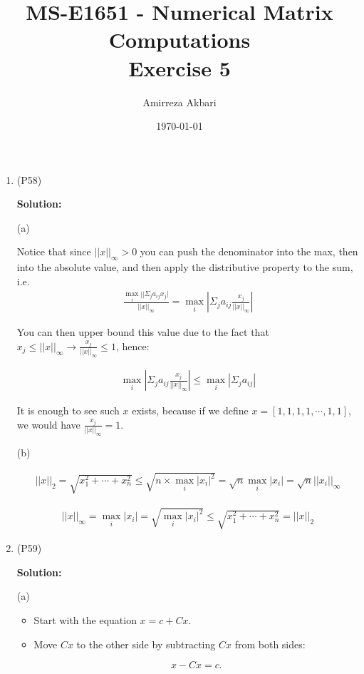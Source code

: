 \documentclass{article}
\title{MS-E1651 - Numerical Matrix Computations
\\Exercise 5}
\author{Amirreza Akbari}
\date{\today}
\begin{document}
\maketitle
\begin{enumerate}[leftmargin=\labelsep]
	\item (P58)
	
	\textbf{Solution:}

	(a) 

	Notice that since $||x||_\infty > 0$ you can push the denominator into the max, then into the absolute value, and then apply the distributive property to the sum, i.e.
	\begin{align}
		\frac{\max_i||\Sigma_j a_{ij}x_j|}{||x||_\infty }= \max_i|\Sigma_j a_{ij}\frac{x_j}{||x||_\infty}|
	\end{align}

	You can then upper bound this value due to the fact that $x_j\leq ||x||_\infty \rightarrow \frac{x_j}{||x||_\infty} \leq 1$, hence:

	\begin{align}
		\max_i|\Sigma_j a_{ij}\frac{x_j}{||x||_\infty}| \leq \max_i |\Sigma_j a_{ij}|
	\end{align}

	It is enough to see such $x$ exists, because if we define $x = [1,1,1,1,\cdots,1,1]$, we would have $\frac{x_j}{||x||_\infty} = 1$.

	(b) 

	\begin{align}
		||x||_2 = \sqrt{x_1^2 + \cdots + x_n^2} \leq \sqrt{n \times \max_i|x_i|^2} = \sqrt{n} \max_i |x_i| =  \sqrt{n} ||x_i||_\infty
	\end{align}

	\begin{align}
		||x||_\infty = \max_i |x_i| = \sqrt{\max_i |x_i|^2} \leq \sqrt{x_1^2 + \cdots + x_n^2} = ||x||_2
	\end{align}

	\item (P59)
	
	\textbf{Solution:}

	(a)

	\begin{itemize}
		\item Start with the equation $x = c + Cx$.
		
		\item Move $Cx$ to the other side by subtracting $Cx$ from both sides:
		
		\[x - Cx = c.\]
		

\end{itemize}
\end{enumerate}
\end{document}
